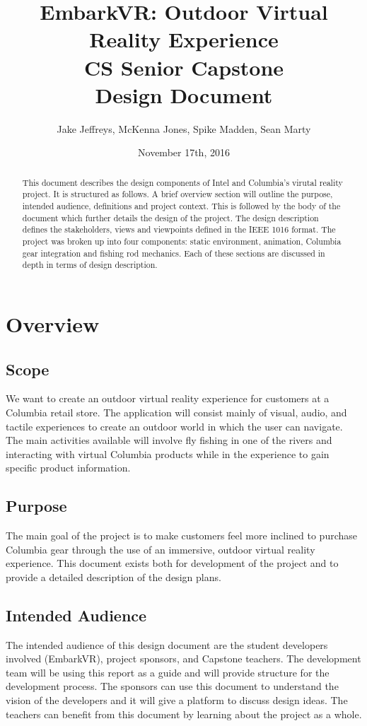 \documentclass[10pt,journal,compsoc,onecolumn, draftclsnofoot]{IEEEtran}
\title{
EmbarkVR: Outdoor Virtual Reality Experience \\
CS Senior Capstone \\
Design Document\\
\vspace{3cm}
}
\author{Jake Jeffreys, McKenna Jones, Spike Madden, Sean Marty}
\date{November 17th, 2016}
\begin{document}
\begin{titlepage}
\vspace{3cm}
\maketitle
\vspace{3cm}
\begin{abstract}
This document describes the design components of Intel and Columbia's virutal reality project. It is structured as follows. A brief overview section will outline the purpose, intended audience, definitions and project context. This is followed by the body of the document which further details the design of the project. The design description defines the stakeholders, views and viewpoints defined in the IEEE 1016 format. The project was broken up into four components: static environment, animation, Columbia gear integration and fishing rod mechanics. Each of these sections are discussed in depth in terms of design description.
\end{abstract}

\end{titlepage}
\tableofcontents
\clearpage

\section{Overview}
\subsection{Scope}
We want to create an outdoor virtual reality experience for customers at a Columbia retail store. The application will consist mainly of visual, audio, and tactile experiences to create an outdoor world in which the user can navigate. The main activities available will involve fly fishing in one of the rivers and interacting with virtual Columbia products while in the experience to gain specific product information.

\subsection{Purpose}
The main goal of the project is to make customers feel more inclined to purchase Columbia gear through the use of an immersive, outdoor virtual reality experience. This document exists both for development of the project and to provide a detailed description of the design plans.

\subsection{Intended Audience}
The intended audience of this design document are the student developers involved (EmbarkVR), project sponsors, and Capstone teachers. The development team will be using this report as a guide and will provide structure for the development process. The sponsors can use this document to understand the vision of the developers and it will give a platform to discuss design ideas. The teachers can benefit from this document by learning about the project as a whole.
\end{document}
